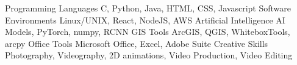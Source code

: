 \begin{cvskills}
\cvskill
{Programming Languages}
{ C, Python, Java, HTML, CSS, Javascript}
\cvskill
{Software Environments}
{ Linux/UNIX, React, NodeJS, AWS}
\cvskill
{Artificial Intelligence}
{ AI Models, PyTorch, numpy, RCNN}
\cvskill
{GIS Tools}
{ ArcGIS, QGIS, WhiteboxTools, arcpy}
\cvskill
{Office Tools}
{ Microsoft Office, Excel, Adobe Suite}
\cvskill
{Creative Skills}
{ Photography, Videography, 2D animations, Video Production, Video Editing}

\end{cvskills}